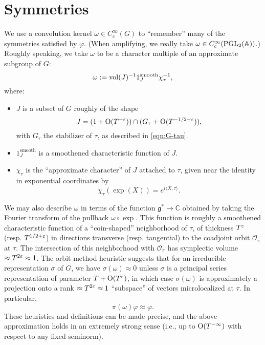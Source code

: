 \documentclass[reqno]{amsart} 
\numberwithin{equation}{section}
\numberwithin{theorem}{section}
\begin{document}
\section{Symmetries}\label{sec:org1580512}
We use a convolution kernel $\omega \in C_c^\infty(G)$ to ``remember'' many of the symmetries satisfied by $\varphi$.  (When amplifying, we really take $\omega \in C_c^\infty(\operatorname{PGL}_2(\mathbb{A}))$.)  Roughly speaking, we take $\omega$ to be a character multiple of an approximate subgroup of $G$:
\begin{equation*}
  \omega := \operatorname{vol}(J)^{-1} 1_J^{\text{smooth}} \chi_\tau^{-1},
\end{equation*}
where:
\begin{itemize}
\item $J$ is a subset of $G$ roughly of the shape
  \begin{equation*}
    J = (1 + \operatorname{O}(T^{-\varepsilon})) \cap (G_\tau + \operatorname{O}(T^{-1/2-\varepsilon})),
  \end{equation*}
  with $G_\tau$ the stabilizer of $\tau$, as described in \eqref{eqn:G-tau}.
\item $1_J^{\text{smooth}}$ is a smoothened characteristic function of $J$.
\item $\chi_\tau$ is the ``approximate character'' of $J$ attached to $\tau$, given near the identity in exponential coordinates by
  \begin{equation*}
    \chi_\tau(\exp(X)) = e^{i \langle X, \tau \rangle}.
  \end{equation*}  
\end{itemize}

We may also describe $\omega$ in terms of the function $\mathfrak{g}^* \rightarrow \mathbb{C}$ obtained by taking the Fourier transform of the pullback $\omega \circ \exp$.  This function is roughly a smoothened characteristic function of a ``coin-shaped'' neighborhood of $\tau$, of thickness $T^\varepsilon$ (resp. $T^{1/2+\varepsilon}$) in directions transverse (resp. tangential) to the coadjoint orbit $\mathcal{O}_\pi$ at $\tau$.  The intersection of this neighborhood with $\mathcal{O}_\pi$ has symplectic volume $\approx T^{2 \varepsilon} \approx 1$.  The orbit method heuristic suggests that for an irreducible representation $\sigma$ of $G$, we have $\sigma(\omega) \approx 0$ unless $\sigma$ is a principal series representation of parameter $T + \operatorname{O}(T^{\varepsilon})$, in which case $\sigma(\omega)$ is approximately a projection onto a rank $\approx T^{2 \varepsilon} \approx 1$ ``subspace'' of vectors microlocalized at $\tau$.  In particular,
\begin{equation}\label{eqn:35ac3e34eb}
  \pi(\omega) \varphi \approx \varphi.
\end{equation}
These heuristics and definitions can be made precise, and the above approximation holds in an extremely strong sense (i.e., up to $\operatorname{O}(T^{-\infty})$ with respect to any fixed seminorm).
\end{document}
